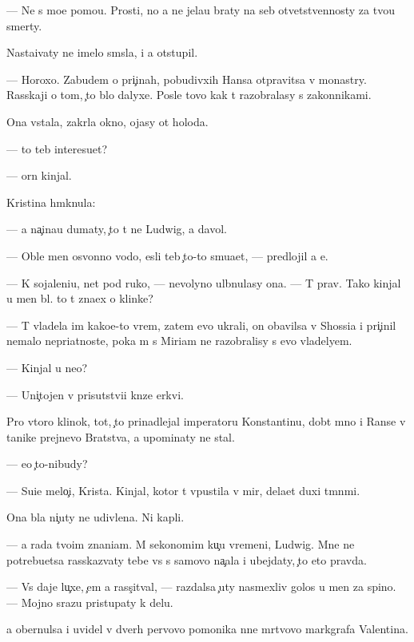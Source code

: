 \documentclass[10pt]{book}
\begin{document}
— Ne s mo{\y}e{\y} pomo{\x}{\y}u. Prosti, no {\y}a ne jela{\y}u braty na seb{\ia} otvetstvennosty za tvo{\y}u smerty.

Nasta{\y}ivaty ne imelo sm{\yi}sla, i {\y}a otstupil.

— Horoxo. Zabudem o pri{\c}inah, pobudivxih Hansa otpravitsa v monast{\yi}ry. Rasskaji o tom, {\c}to b{\yi}lo dalyxe. Posle tovo kak t{\yi} razobralasy s zakonnikami.

Ona vstala, zakr{\yi}la okno, {\y}ojasy ot holoda.

— {\C}to teb{\ia} interesu{\y}et?

—  {\C}orn{\yi}{\y} kinjal.

Kristina hm{\yi}knula:

— {\Y}a na{\c}ina{\y}u dumaty, {\c}to t{\yi} ne Ludwig, a d{\y}avol.

— Oble{\y} men{\ia} osv{\ia}{\x}onno{\y} vodo{\y}, {\y}esli teb{\ia} {\c}to-to smu{\x}a{\y}et, — predlojil {\y}a {\y}e{\y}.

— K sojaleni{\y}u, net pod ruko{\y}, — nevolyno ul{\yi}bnulasy ona. — T{\yi} prav. Tako{\y} kinjal u men{\ia} b{\yi}l. {\C}to t{\yi} zna{\y}ex o klinke?

— T{\yi} vladela im kako{\y}e-to vrem{\ia}, zatem {\y}evo ukrali, on ob{\y}avilsa v Shossi{\y}a i pri{\c}inil nemalo nepri{\y}atnoste{\y}, poka m{\yi} s Miriam ne razobralisy s {\y}evo vladely{\q}em.

— Kinjal u ne{\y}o?

— Uni{\c}tojen v prisutstvi{\y}i kn{\ia}ze{\y} {\Q}erkvi.

Pro vtoro{\y} klinok, tot, {\c}to prinadlejal imperatoru Konstantinu, dob{\yi}t{\yi}{\y} mno{\y} i Ranse v ta{\y}nike prejnevo Bratstva, {\y}a upominaty ne stal.

— {\Y}e{\x}o {\c}to-nibudy?

— Su{\x}i{\y}e melo{\c}i, Krista. Kinjal, kotor{\yi}{\y} t{\yi} v{\yi}pustila v mir, dela{\y}et duxi t{\e}mn{\yi}mi.

Ona b{\yi}la ni{\c}uty ne udivlena. Ni kapli.

— {\Y}a rada tvo{\y}im znani{\y}am. M{\yi} sekonomim ku{\c}u vremeni, Ludwig. Mne ne potrebu{\y}etsa rasskaz{\yi}vaty tebe vs{\e} s samovo na{\c}ala i ubejdaty, {\c}to eto pravda.

— Vs{\e} daje lu{\c}xe, {\c}em {\y}a rass{\c}it{\yi}val, — razdalsa {\c}uty nasmexliv{\yi}{\y} golos u men{\ia} za spino{\y}. — Mojno srazu pristupaty k delu.

{\Y}a obernulsa i uvidel v dver{\ia}h pervovo pomo{\x}nika n{\yi}ne m{\e}rtvovo markgrafa Valentina.
\end{document}
